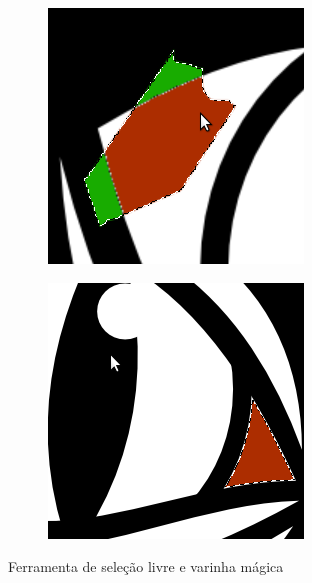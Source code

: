 \documentclass[12pt,onecolumn]{article}
\begin{document}
    \begin{figure}[H]
      \centering
      \begin{subfigure}{.5\textwidth}
        \centering
        \includegraphics[width=.7\linewidth]{screenshots/02-free_select.png}
        \label{fig:free_select}
      \end{subfigure}%
      \begin{subfigure}{.5\textwidth}
        \centering
        \includegraphics[width=.7\linewidth]{screenshots/03-fuzzy_select.png}
        \label{fig:fuzzy_select}
      \end{subfigure}
      \caption{Ferramenta de seleção livre e varinha mágica}
      \label{fig:select_tools}
    \end{figure}
\end{document}
